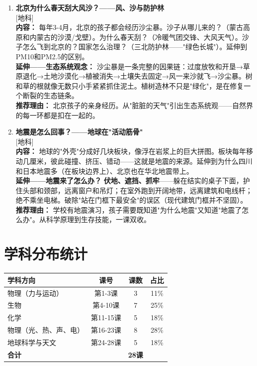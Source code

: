\documentclass[a4paper,12pt]{ctexart}
\newcommand{\tagearth}{\textcolor{earth}{\small [地科]}}
\begin{document}
\begin{enumerate}
\item[\textbf{第27课}] \textbf{北京为什么春天刮大风沙？——风、沙与防护林} \\
\tagearth \\
\textbf{内容：} 每年3-4月，北京的孩子都会经历沙尘暴。沙子从哪儿来的？（蒙古高原和内蒙古的沙漠/戈壁）。为什么春天刮？（冷暖气团交锋、大风天气）。沙子怎么飞到北京的？国家怎么治理？（三北防护林——"绿色长城"）。延伸到PM10和PM2.5的区别。\\
\textbf{延伸——生态系统观念：} 沙尘暴是一条完整的因果链：过度放牧和开垦→草原退化→土地沙漠化→植被消失→土壤失去固定→风一来沙就飞→沙尘暴。树和草的根就像无数只小手紧紧抓住泥土。植树造林不只是"绿化"，是在修复一个断裂的生态链条。\\
\textbf{推荐理由：} 北京孩子的亲身经历。从"脏脏的天气"引出生态系统观——自然界的每一环都是扣在一起的。

\item[\textbf{第28课}] \textbf{地震是怎么回事？——地球在"活动筋骨"} \\
\tagearth \\
\textbf{内容：} 地球的"外壳"分成好几块板块，像浮在岩浆上的巨大拼图。板块每年移动几厘米，彼此碰撞、挤压、错动——这就是地震的来源。延伸到为什么四川和日本地震多（在板块边界上）、北京也在华北地震带上。\\
\textbf{延伸——地震来了怎么办？} \textbf{伏地、遮挡、抓牢}——躲在结实的桌子下面，护住头部和颈部，远离窗户和吊灯；在室外跑到开阔地带，远离建筑和电线杆；绝不乘坐电梯。破除"站在门框下最安全"的误区（现代建筑门框并不坚固）。\\
\textbf{推荐理由：} 学校有地震演习，孩子需要既知道"为什么地震"又知道"地震了怎么办"。从科学原理到生存技能，一课双收。

\end{enumerate}

\newpage

\section*{\textcolor{blue!70!black}{学科分布统计}}

\begin{center}
\begin{tabular}{|l|c|c|c|}
\hline
\textbf{学科方向} & \textbf{课号} & \textbf{课数} & \textbf{占比} \\
\hline
物理（力与运动） & 第1-3课 & 3 & 11\% \\
生物 & 第4-10课 & 7 & 25\% \\
化学 & 第11-15课 & 5 & 18\% \\
物理（光、热、声、电）& 第16-23课 & 8 & 28\% \\
地球科学与天文 & 第24-28课 & 5 & 18\% \\
\hline
\textbf{合计} & & \textbf{28课} & \\
\hline
\end{tabular}
\end{center}
\end{document}
